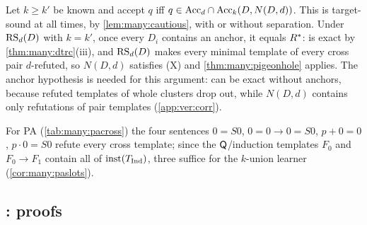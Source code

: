 \begin{remark}\label{rem:many:combine}
Let $k\ge k'$ be known and accept $q$ iff $q\in\mathrm{Acc}_d\cap\mathrm{Acc}_k(D,N(D,d))$. This is target-sound at all times, by
\cref{lem:many:cautious}, with or without separation. Under $\mathrm{RS}_d(D)$ with $k=k'$, once every $D_i$ contains an anchor, it
equals $R^{*}$: \DTRC{} is exact by \cref{thm:many:dtrc}(iii), and $\mathrm{RS}_d(D)$ makes every minimal template of every
cross pair $d$-refuted, so $N(D,d)$ satisfies (X) and \cref{thm:many:pigeonhole} applies. The anchor hypothesis is
needed for this argument: \DTRC{} can be exact without anchors, because refuted templates of whole clusters drop out,
while $N(D,d)$ contains only refutations of pair templates (\cref{app:ver:corr}).
\end{remark}

For PA (\cref{tab:many:pacross}) the four sentences $0=S0$, $0=0\to0=S0$, $p+0=0$, $p\cdot0=S0$ refute every cross template;
since the $\mathsf{Q}$/induction templates $F_0$ and $F_0\to F_1$ contain all of $\mathrm{inst}(T_{\mathrm{Ind}})$, three suffice for the
$k$-union learner (\cref{cor:many:paslots}).

\subsection{\texorpdfstring{\DTRC}{DTRC}: proofs}\label{app:many:dtrc}

